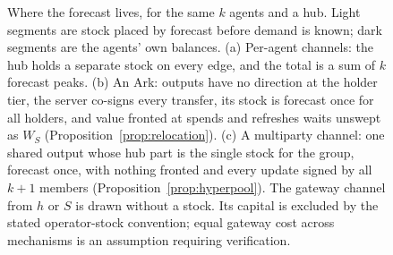 \begin{figure}[t]
\caption{Where the forecast lives, for the same $k$ agents and a hub. Light segments are stock placed by forecast before demand is known; dark segments are the agents' own balances. (a) Per-agent channels: the hub holds a separate stock on every edge, and the total is a sum of $k$ forecast peaks. (b) An Ark: outputs have no direction at the holder tier, the server co-signs every transfer, its stock is forecast once for all holders, and value fronted at spends and refreshes waits unswept as $W_S$ (Proposition~\ref{prop:relocation}). (c) A multiparty channel: one shared output whose hub part is the single stock for the group, forecast once, with nothing fronted and every update signed by all $k+1$ members (Proposition~\ref{prop:hyperpool}). The gateway channel from $h$ or $S$ is drawn without a stock. Its capital is excluded by the stated operator-stock convention; equal gateway cost across mechanisms is an assumption requiring verification.}
\label{fig:objects}
\end{figure}
